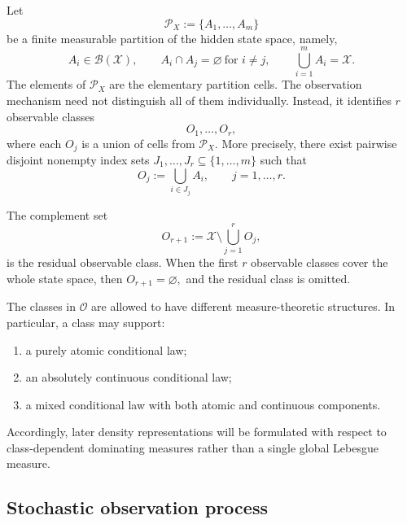\documentclass[10pt,twocolumn]{article}
\theoremstyle{remark}
\newcommand{\B}{\mathcal{B}}
\newcommand{\Oo}{\mathcal{O}}
\newcommand{\Pcal}{\mathcal{P}}
\newcommand{\Xcal}{\mathcal{X}}
\begin{document}
Let
\begin{equation*}
\Pcal_X:=\{A_1,\ldots,A_m\}
\label{eq:primary-partition}
\end{equation*}
be a finite measurable partition of the hidden state space, namely,
\[
A_i\in\B(\Xcal),
\qquad
A_i\cap A_j=\varnothing\ \text{for }i\neq j,
\qquad
\bigcup_{i=1}^m A_i=\Xcal.
\]
The elements of $\Pcal_X$ are the elementary partition cells. The observation mechanism need not distinguish all of them individually. Instead, it identifies $r$ observable classes
\[
O_1,\ldots,O_r,
\]
where each $O_j$ is a union of cells from $\Pcal_X$. More precisely, there exist pairwise disjoint nonempty index sets $J_1,\ldots,J_r\subseteq\{1,\ldots,m\}$ such that
\begin{equation*}
O_j:=\bigcup_{i\in J_j}A_i,
\qquad j=1,\ldots,r.
\label{eq:observable-classes}
\end{equation*}

The complement set
\begin{equation*}
O_{r+1}
:=
\Xcal\setminus\bigcup_{j=1}^{r}O_j,
\label{eq:residual-class}
\end{equation*}
is the residual observable class. When the first $r$ observable classes cover the whole state space, then $O_{r+1}=\varnothing,$ and the residual class is omitted. 


The classes in $\Oo$ are allowed to have different measure-theoretic structures. In particular, a class may support:
\begin{enumerate}[label=\textnormal{(\alph*)},leftmargin=*]
    \item a purely atomic conditional law;
    \item an absolutely continuous conditional law;
    \item a mixed conditional law with both atomic and continuous components.
\end{enumerate}
Accordingly, later density representations will be formulated with respect to class-dependent dominating measures rather than a single global Lebesgue measure.

\subsection{Stochastic observation process}
\label{subsec:observation-process}
\end{document}
